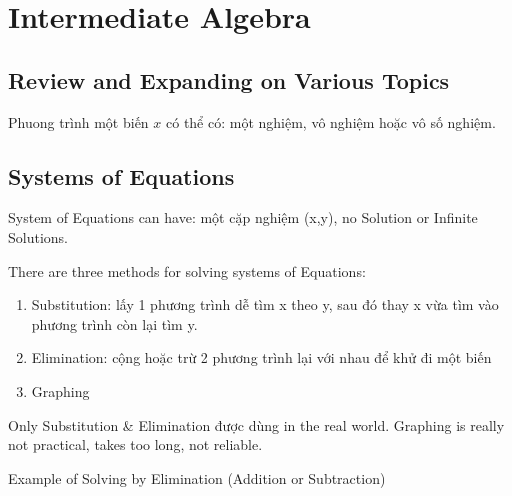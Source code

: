 \chapter{Intermediate Algebra}

\section{Review and Expanding on Various Topics}

Phuong trình một biến $x$ có thể có: một nghiệm, vô nghiệm hoặc vô số nghiệm.

\section{Systems of Equations}

%
%

System of Equations can have: một cặp nghiệm (x,y), no Solution or Infinite Solutions.

There are three methods for solving systems of Equations:

\begin{enumerate}
  \item Substitution: lấy 1 phương trình dễ tìm x theo y, sau đó thay x vừa tìm vào phương trình còn lại tìm y.
  \item Elimination: cộng hoặc trừ 2 phương trình lại với nhau để khử đi một biến
  \item Graphing
\end{enumerate}

Only Substitution \& Elimination được dùng in the real world. Graphing is really not practical, takes too long, not reliable.


Example of Solving by Elimination (Addition or Subtraction)


